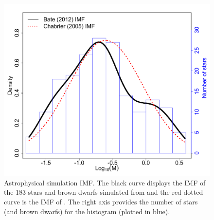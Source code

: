 \documentclass[12pt]{article}
\begin{document}
\begin{figure}[htbp]
\centering
\includegraphics[width = .5\textwidth]{figures/bate_imf.pdf} 
\caption{Astrophysical simulation IMF.  The black curve displays the IMF of the 183 stars and brown dwarfs simulated from \cite{Bate2012} and the red dotted curve is the IMF of \cite{chabrier2005}.  The right axis provides the number of stars (and brown dwarfs) for the histogram (plotted in blue).
   }
   \label{fig:bate1}
\end{figure}
\end{document}
